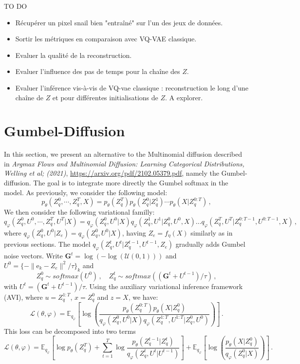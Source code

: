 \documentclass{article}
\newcommand{\rme}{\mathrm{e}}
\begin{document}
TO DO 

\begin{itemize}
\item Récupérer un pixel snail bien "entraîné" sur l'un des jeux de données.
\item Sortir les métriques en comparaison avec VQ-VAE classique.
\item Evaluer la qualité de la reconstruction.
\item Evaluer l'influence des pas de temps pour la chaîne des $Z$.
\item Evaluer l'inférence vis-à-vis de VQ-vae classique : reconstruction le long d'une chaîne de $Z$ et pour différentes initialisations de $Z$. A explorer.
\end{itemize}



\clearpage
\newpage

\section{Gumbel-Diffusion}
In this section, we present an alternative to the Multinomial diffusion described in {\em Argmax Flows and Multinomial Diffusion: Learning Categorical Distributions, Welling et al; (2021)}, \url{https://arxiv.org/pdf/2102.05379.pdf}, namely the Gumbel-diffusion. The goal is to integrate more directly the Gumbel softmax in the model. As previously, we consider the following model:
$$
p_{\theta}(Z_q^0, \cdots, Z_q^T, X) = p_{\theta}(Z_q^T) p_{\theta}(Z_q^0|Z_q^1) \cdots p_{\theta}(X|Z^{0:T}_q)\,,
$$
We then consider the following variational familly:
$$
q_{\varphi}(Z_q^0, U^0, \cdots, Z_q^T,U^T | X) = q_{\varphi}(Z_q^0,U^0 | X) q_{\varphi}(Z_q^1,U^1 | Z_q^0, U^0,X) \ldots  q_{\varphi}(Z_q^T,U^T | Z_q^{0:T-1}, U^{0:T-1}, X)\,,
$$
where $q_{\varphi}(Z_q^0,U^0 | Z_e) = q_{\varphi}(Z_q^0,U^0 | X)$, having $Z_e = f_\eta(X)$ similarly as in  previous sections. The model $q_{\varphi}(Z_q^t ,U^t| Z_q^{t-1},U^{t-1}, Z_e)$ gradually adds Gumbel noise vectors. Write  $\mathbf{G}^t = \log(-\log(\mathcal{U}(0,1)))$ and $U^0 = \{- \| \rme_k - Z_e\|^2/ \tau\}_k $ and 
$$
	Z_q^0 \sim softmax(U^0 )\,, \quad Z_q^t \sim softmax((\mathbf{G}^t +U^{t-1}) / \tau)\,,
$$
with $U^t = (\mathbf{G}^t +U^{t-1}) / \tau$. Using the auxiliary variational inference framework (AVI), where $u = Z_q^{1:T}$, $x = Z_q^0$ and $z = X$, we have:
$$
\mathcal{L}(\theta, \varphi) = \mathbb{E}_{q_\varphi} \left[ \log\left(\frac{p_\theta(Z_q^{0:T})p_\theta(X|Z_q^0)}{q_\varphi(Z_q^0,U^0|X) q_\varphi(Z_q^{1:T},U^{1:T}|Z_q^0,U^0)}\right) \right]\,.
$$
This loss can be decomposed into two terms
$$
\mathcal{L}(\theta, \varphi) = \mathbb{E}_{q_\varphi} \left[\log p_\theta(Z_q^T) + \sum_{t=1}^T\log  \frac{p_\theta(Z_q^{t-1}|Z_q^t)}{q_\varphi(Z_q^{t},U^t|U^{t-1})} \right] + \mathbb{E}_{q_\varphi} \left[ \log\left(\frac{p_\theta(X|Z_q^0)}{q_\varphi(Z_q^0|X)}\right) \right]\,.
$$
\end{document}
